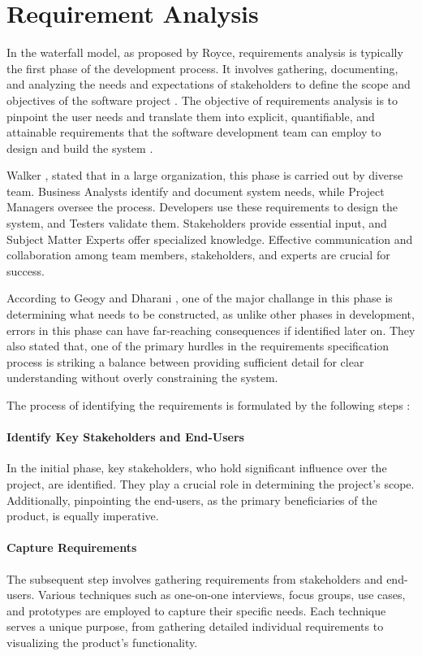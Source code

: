 \chapter{Requirement Analysis}
\label{chapter:requirement-analysis}

In the waterfall model, as proposed by Royce, requirements analysis is typically the first phase of the development process. It involves gathering, documenting, and analyzing the needs and expectations of stakeholders to define the scope and objectives of the software project \cite{Hausen}. The objective of requirements analysis is to pinpoint the user needs and translate them into explicit, quantifiable, and attainable requirements that the software development team can employ to design and build the system \cite{Walker_2023}.

Walker \cite{Walker_2023}, stated that in a large organization, this phase is carried out by diverse team. Business Analysts identify and document system needs, while Project Managers oversee the process. Developers use these requirements to design the system, and Testers validate them. Stakeholders provide essential input, and Subject Matter Experts offer specialized knowledge. Effective communication and collaboration among team members, stakeholders, and experts are crucial for success.

According to Geogy and Dharani \cite{Geogy2016}, one of the major challange in this phase is determining what needs to be constructed, as unlike other phases in development, errors in this phase can have far-reaching consequences if identified later on. They also stated that, one of the primary hurdles in the requirements specification process is striking a balance between providing sufficient detail for clear understanding without overly constraining the system.

The process of identifying the requirements is formulated by the following steps \cite{Simplilearn_2023}:

\subsubsection{Identify Key Stakeholders and End-Users}
In the initial phase, key stakeholders, who hold significant influence over the project, are identified. They play a crucial role in determining the project's scope. Additionally, pinpointing the end-users, as the primary beneficiaries of the product, is equally imperative.

\subsubsection{Capture Requirements}
The subsequent step involves gathering requirements from stakeholders and end-users. Various techniques such as one-on-one interviews, focus groups, use cases, and prototypes are employed to capture their specific needs. Each technique serves a unique purpose, from gathering detailed individual requirements to visualizing the product's functionality.

